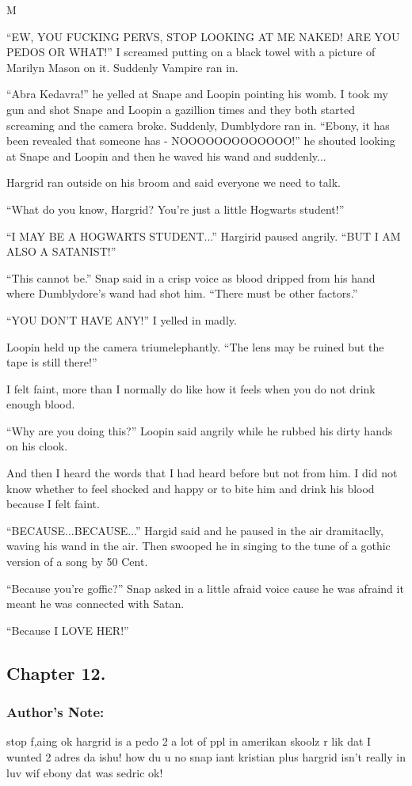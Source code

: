 M\documentclass{article}
\begin{document}
“EW, YOU FUCKING PERVS, STOP LOOKING AT ME NAKED! ARE YOU PEDOS OR WHAT!” I screamed putting on a black towel with a picture of Marilyn Mason on it. Suddenly Vampire ran in.

“Abra Kedavra!” he yelled at Snape and Loopin pointing his womb. I took my gun and shot Snape and Loopin a gazillion times and they both started screaming and the camera broke. Suddenly, Dumblydore ran in. “Ebony, it has been revealed that someone has - NOOOOOOOOOOOOO!” he shouted looking at Snape and Loopin and then he waved his wand and suddenly...

Hargrid ran outside on his broom and said everyone we need to talk.

“What do you know, Hargrid? You’re just a little Hogwarts student!”

“I MAY BE A HOGWARTS STUDENT...” Hargirid paused angrily. “BUT I AM ALSO A SATANIST!”

“This cannot be.” Snap said in a crisp voice as blood dripped from his hand where Dumblydore’s wand had shot him. “There must be other factors.”

“YOU DON’T HAVE ANY!” I yelled in madly.

Loopin held up the camera triumelephantly. “The lens may be ruined but the tape is still there!”

I felt faint, more than I normally do like how it feels when you do not drink enough blood.

“Why are you doing this?” Loopin said angrily while he rubbed his dirty hands on his clook.

And then I heard the words that I had heard before but not from him. I did not know whether to feel shocked and happy or to bite him and drink his blood because I felt faint.

“BECAUSE...BECAUSE...” Hargid said and he paused in the air dramitaclly, waving his wand in the air. Then swooped he in singing to the tune of a gothic version of a song by 50 Cent.

“Because you’re goffic?” Snap asked in a little afraid voice cause he was afraind it meant he was connected with Satan.

“Because I LOVE HER!”

\clearpage\nolinenumbers
\subsection*{Chapter 12.}

\subsubsection*{Author's Note: }stop f,aing ok hargrid is a pedo 2 a lot of ppl in amerikan skoolz r lik dat I wunted 2 adres da ishu! how du u no snap iant kristian plus hargrid isn’t really in luv wif ebony dat was sedric ok!
\end{document}
